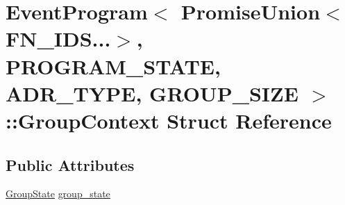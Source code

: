 \hypertarget{structEventProgram_3_01PromiseUnion_3_01FN__IDS_8_8_8_4_00	PROGRAM__STATE_00	ADR__TYPE_00	GROUP__SIZE_01_4_1_1GroupContext}{\section{Event\-Program$<$ Promise\-Union$<$ F\-N\-\_\-\-I\-D\-S...$>$, P\-R\-O\-G\-R\-A\-M\-\_\-\-S\-T\-A\-T\-E, A\-D\-R\-\_\-\-T\-Y\-P\-E, G\-R\-O\-U\-P\-\_\-\-S\-I\-Z\-E $>$\-:\-:Group\-Context Struct Reference}
\label{structEventProgram_3_01PromiseUnion_3_01FN__IDS_8_8_8_4_00	PROGRAM__STATE_00	ADR__TYPE_00	GROUP__SIZE_01_4_1_1GroupContext}
}
\subsection*{Public Attributes}
\begin{DoxyCompactItemize}
\item 
\hyperlink{structEventProgram_3_01PromiseUnion_3_01FN__IDS_8_8_8_4_00	PROGRAM__STATE_00	ADR__TYPE_00	GROUP__SIZE_01_4_a1b56118a40944d4b1acff1bad3602e47}{Group\-State} \hyperlink{structEventProgram_3_01PromiseUnion_3_01FN__IDS_8_8_8_4_00	PROGRAM__STATE_00	ADR__TYPE_00	GROUP__SIZE_01_4_1_1GroupContext_a98c667fc425c97186e5e92b68682f81b}{group\-\_\-state}
\end{DoxyCompactItemize}


